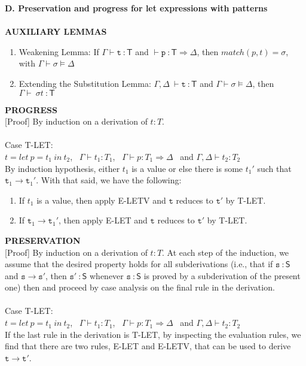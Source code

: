 \documentclass[a4paper]{article}
\begin{document}
\textbf{D. Preservation and progress for let expressions with patterns}\\\\
\textbf{AUXILIARY LEMMAS}
\begin{enumerate}
\item Weakening Lemma: If $\mathtt{\Gamma \vdash t} ~\mathsf{:T}$ and $\mathtt{\vdash p} ~\mathsf{:T} \Rightarrow \Delta$, then $match(p, t) = \sigma$, with $\mathtt{\Gamma \vdash} \sigma \models \Delta$
\item Extending the Substitution Lemma: $\mathtt{\Gamma}, \Delta \ \mathtt{\vdash t} ~\mathsf{:T}$ and $\mathtt{\Gamma \vdash} \sigma \models \Delta$, then $\mathtt{\Gamma \vdash} \ \sigma t ~\mathsf{:T}$
\end{enumerate}
\textbf{PROGRESS}\\
{[Proof]} By induction on a derivation of $t:T$.\\\\
Case T-LET:\\
$t = let \ p = t_1 \ in \ t_2$, \ $\Gamma\vdash t_1 : T_1$, \ $\Gamma\vdash p : T_1 \Rightarrow \Delta$ \ and $\Gamma, \Delta \vdash t_2 : T_2$\\ By induction hypothesis, either $t_1$ is a value or else there is some $t_1'$ such that $\mathtt t_1 \rightarrow \mathtt t_1'$. With that said, we have the following:
\begin{enumerate}
\item If $t_1$ is a value, then apply E-LETV and $\mathtt t$ reduces to $\mathtt t'$ by T-LET.
\item If $\mathtt t_1 \rightarrow \mathtt t_1'$, then apply E-LET and $\mathtt t$ reduces to $\mathtt t'$ by T-LET.
\end{enumerate} 
\textbf{PRESERVATION} \\
{[Proof]} By induction on a derivation of $t:T$. At each step of the induction, we assume that the desired property holds for all subderivations (i.e., that if $\mathtt s ~\mathsf {: S}$ and $\mathtt s \rightarrow \mathtt s'$, then $\mathtt s' ~\mathsf {: S}$ whenever $\mathtt s ~\mathsf {: S}$ is proved by a subderivation of the present one) then  and proceed by case analysis on the final rule in the derivation.\\\\
Case T-LET:\\
$t = let \ p = t_1 \ in \ t_2$, \ $\Gamma\vdash t_1 : T_1$, \ $\Gamma\vdash p : T_1 \Rightarrow \Delta$ \ and $\Gamma, \Delta \vdash t_2 : T_2$\\
If the last rule in the derivation is T-LET, by inspecting the evaluation rules, we find that there are two rules, E-LET and E-LETV, that can be used to derive $\mathtt t \rightarrow \mathtt{t'}$.
\end{document}
